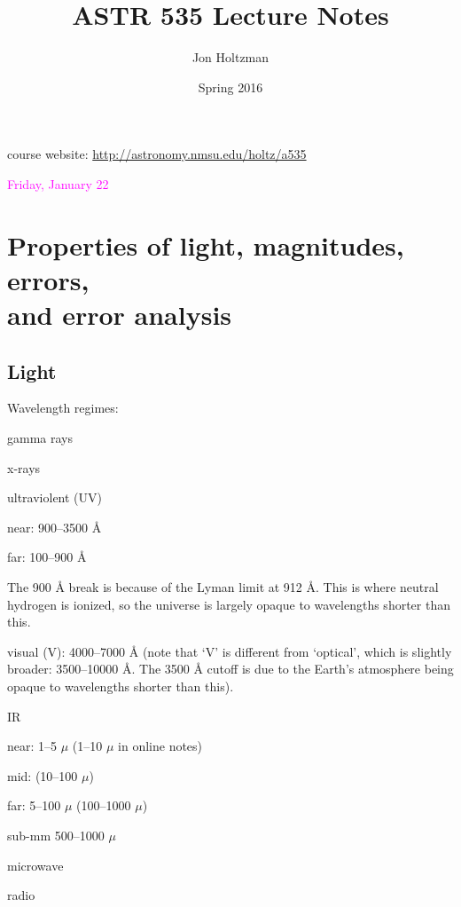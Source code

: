 \documentclass[12pt]{article}
\title{\vspace{-0.75in}ASTR 535 Lecture Notes}
\author{Jon Holtzman}
\date{Spring 2016}
\begin{document}
\maketitle

course website: \textcolor{blue}
{\url{http://astronomy.nmsu.edu/holtz/a535}}


\textcolor{magenta}{Friday, January 22}
\section*{Properties of light, magnitudes, errors,\\
and error analysis}

\subsection*{Light}
Wavelength regimes:
\begin{itemize*}
    \item gamma rays
    \item x-rays
    \item ultraviolent (UV)
        \begin{itemize*}
            \item near: 900--3500 \AA{}
            \item far: 100--900 \AA{}
        \end{itemize*}
        The 900 \AA{} break is because of the Lyman limit at 912 \AA{}.
        This is where neutral hydrogen is ionized, so the universe is largely
        opaque to wavelengths shorter than this.
    \item visual (V): 4000--7000 \AA{}
    (note that `V' is different from `optical',
        which is slightly broader: 3500--10000 \AA{}. The 3500 \AA{} cutoff
        is due to the Earth's atmosphere being opaque to wavelengths shorter
        than this).
    \item IR
        \begin{itemize*}
            \item near: 1--5 $\mu$ (1--10 $\mu$ in online notes)
            \item mid: (10--100 $\mu$)
            \item far: 5--100 $\mu$ (100--1000 $\mu$)
        \end{itemize*}
    \item sub-mm 500--1000 $\mu$
    \item microwave
    \item radio
\end{itemize*}
\end{document}
